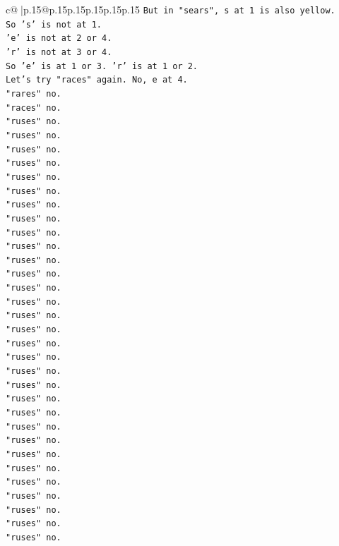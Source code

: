 \documentclass{article}
\begin{document}
{\begin{supertabular}{c@{$\;$}|p{.15\linewidth}@{}p{.15\linewidth}p{.15\linewidth}p{.15\linewidth}p{.15\linewidth}p{.15\linewidth}}
{{{\texttt{But in "sears", s at 1 is also yellow.} \\
\texttt{So 's' is not at 1.} \\
\texttt{'e' is not at 2 or 4.} \\
\texttt{'r' is not at 3 or 4.} \\
\texttt{So 'e' is at 1 or 3. 'r' is at 1 or 2.} \\
\texttt{Let's try "races" again. No, e at 4.} \\
\texttt{"rares" no.} \\
\texttt{"races" no.} \\
\texttt{"ruses" no.} \\
\texttt{"ruses" no.} \\
\texttt{"ruses" no.} \\
\texttt{"ruses" no.} \\
\texttt{"ruses" no.} \\
\texttt{"ruses" no.} \\
\texttt{"ruses" no.} \\
\texttt{"ruses" no.} \\
\texttt{"ruses" no.} \\
\texttt{"ruses" no.} \\
\texttt{"ruses" no.} \\
\texttt{"ruses" no.} \\
\texttt{"ruses" no.} \\
\texttt{"ruses" no.} \\
\texttt{"ruses" no.} \\
\texttt{"ruses" no.} \\
\texttt{"ruses" no.} \\
\texttt{"ruses" no.} \\
\texttt{"ruses" no.} \\
\texttt{"ruses" no.} \\
\texttt{"ruses" no.} \\
\texttt{"ruses" no.} \\
\texttt{"ruses" no.} \\
\texttt{"ruses" no.} \\
\texttt{"ruses" no.} \\
\texttt{"ruses" no.} \\
\texttt{"ruses" no.} \\
\texttt{"ruses" no.} \\
\texttt{"ruses" no.} \\
\texttt{"ruses" no.} \\
\texttt{"ruses" no.} \\
}}}
\end{supertabular}}
\end{document}
